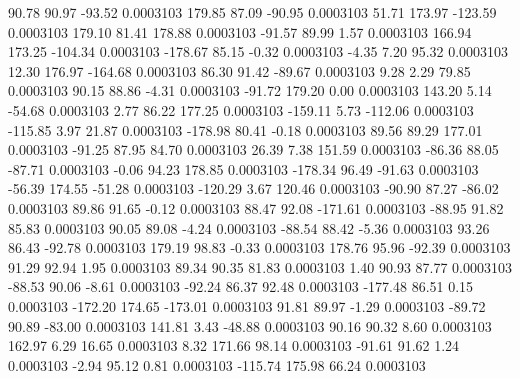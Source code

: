       90.78       90.97      -93.52     0.0003103
      179.85       87.09      -90.95     0.0003103
       51.71      173.97     -123.59     0.0003103
      179.10       81.41      178.88     0.0003103
      -91.57       89.99        1.57     0.0003103
      166.94      173.25     -104.34     0.0003103
     -178.67       85.15       -0.32     0.0003103
       -4.35        7.20       95.32     0.0003103
       12.30      176.97     -164.68     0.0003103
       86.30       91.42      -89.67     0.0003103
        9.28        2.29       79.85     0.0003103
       90.15       88.86       -4.31     0.0003103
      -91.72      179.20        0.00     0.0003103
      143.20        5.14      -54.68     0.0003103
        2.77       86.22      177.25     0.0003103
     -159.11        5.73     -112.06     0.0003103
     -115.85        3.97       21.87     0.0003103
     -178.98       80.41       -0.18     0.0003103
       89.56       89.29      177.01     0.0003103
      -91.25       87.95       84.70     0.0003103
       26.39        7.38      151.59     0.0003103
      -86.36       88.05      -87.71     0.0003103
       -0.06       94.23      178.85     0.0003103
     -178.34       96.49      -91.63     0.0003103
      -56.39      174.55      -51.28     0.0003103
     -120.29        3.67      120.46     0.0003103
      -90.90       87.27      -86.02     0.0003103
       89.86       91.65       -0.12     0.0003103
       88.47       92.08     -171.61     0.0003103
      -88.95       91.82       85.83     0.0003103
       90.05       89.08       -4.24     0.0003103
      -88.54       88.42       -5.36     0.0003103
       93.26       86.43      -92.78     0.0003103
      179.19       98.83       -0.33     0.0003103
      178.76       95.96      -92.39     0.0003103
       91.29       92.94        1.95     0.0003103
       89.34       90.35       81.83     0.0003103
        1.40       90.93       87.77     0.0003103
      -88.53       90.06       -8.61     0.0003103
      -92.24       86.37       92.48     0.0003103
     -177.48       86.51        0.15     0.0003103
     -172.20      174.65     -173.01     0.0003103
       91.81       89.97       -1.29     0.0003103
      -89.72       90.89      -83.00     0.0003103
      141.81        3.43      -48.88     0.0003103
       90.16       90.32        8.60     0.0003103
      162.97        6.29       16.65     0.0003103
        8.32      171.66       98.14     0.0003103
      -91.61       91.62        1.24     0.0003103
       -2.94       95.12        0.81     0.0003103
     -115.74      175.98       66.24     0.0003103
